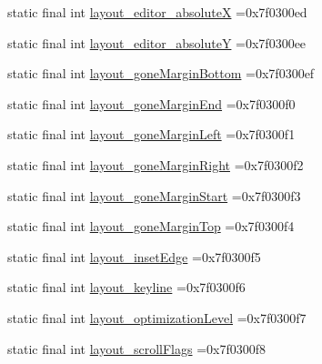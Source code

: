 \begin{DoxyCompactItemize}
\item 
static final int \mbox{\hyperlink{classbr_1_1unb_1_1cic_1_1mp_1_1marketmaster_1_1R_1_1attr_aadcc7bbe1c6db0813a42b49b75318382}{layout\+\_\+editor\+\_\+absoluteX}} =0x7f0300ed
\item 
static final int \mbox{\hyperlink{classbr_1_1unb_1_1cic_1_1mp_1_1marketmaster_1_1R_1_1attr_aa91a58b33d7e786b5ba95960a4a05937}{layout\+\_\+editor\+\_\+absoluteY}} =0x7f0300ee
\item 
static final int \mbox{\hyperlink{classbr_1_1unb_1_1cic_1_1mp_1_1marketmaster_1_1R_1_1attr_a5e6b4fcdbbc3ecd2d8632bc16769a425}{layout\+\_\+gone\+Margin\+Bottom}} =0x7f0300ef
\item 
static final int \mbox{\hyperlink{classbr_1_1unb_1_1cic_1_1mp_1_1marketmaster_1_1R_1_1attr_a46dcf5ded55fedd00d8476ca1e985f1b}{layout\+\_\+gone\+Margin\+End}} =0x7f0300f0
\item 
static final int \mbox{\hyperlink{classbr_1_1unb_1_1cic_1_1mp_1_1marketmaster_1_1R_1_1attr_a12259df7ab170c308de82e4dc9470e42}{layout\+\_\+gone\+Margin\+Left}} =0x7f0300f1
\item 
static final int \mbox{\hyperlink{classbr_1_1unb_1_1cic_1_1mp_1_1marketmaster_1_1R_1_1attr_a63a046abc58908d36bb00125aa9e7fe6}{layout\+\_\+gone\+Margin\+Right}} =0x7f0300f2
\item 
static final int \mbox{\hyperlink{classbr_1_1unb_1_1cic_1_1mp_1_1marketmaster_1_1R_1_1attr_a2d9114ef63690637032b3b0bbf1e4ecc}{layout\+\_\+gone\+Margin\+Start}} =0x7f0300f3
\item 
static final int \mbox{\hyperlink{classbr_1_1unb_1_1cic_1_1mp_1_1marketmaster_1_1R_1_1attr_a3fd4f6073c19123beb179a85d2eac438}{layout\+\_\+gone\+Margin\+Top}} =0x7f0300f4
\item 
static final int \mbox{\hyperlink{classbr_1_1unb_1_1cic_1_1mp_1_1marketmaster_1_1R_1_1attr_ab0227f12acd48c3f7bb1dbfd44242460}{layout\+\_\+inset\+Edge}} =0x7f0300f5
\item 
static final int \mbox{\hyperlink{classbr_1_1unb_1_1cic_1_1mp_1_1marketmaster_1_1R_1_1attr_ab913f9922247da8a284c0bfcbb0a0d1e}{layout\+\_\+keyline}} =0x7f0300f6
\item 
static final int \mbox{\hyperlink{classbr_1_1unb_1_1cic_1_1mp_1_1marketmaster_1_1R_1_1attr_a5f9bda75fd40fbd42cf354a452b51951}{layout\+\_\+optimization\+Level}} =0x7f0300f7
\item 
static final int \mbox{\hyperlink{classbr_1_1unb_1_1cic_1_1mp_1_1marketmaster_1_1R_1_1attr_a68203b10b1de1203c2109920b545d891}{layout\+\_\+scroll\+Flags}} =0x7f0300f8

\end{DoxyCompactItemize}
